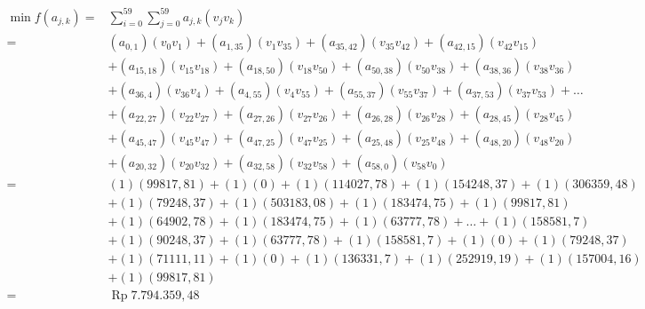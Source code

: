 {        {\footnotesize
            \begin{equation*}
                \begin{aligned}
                    \operatorname{min} f(a_{j,k}) = & \sum^{59}_{i=0} \sum^{59}_{j=0} a_{j,k}(v_{j}v_{k})                                                             \\
                    =                               & (a_{0,1})(v_{0}v_{1}) +(a_{1,35})(v_{1}v_{35}) +(a_{35,42})(v_{35}v_{42}) +(a_{42,15})(v_{42}v_{15})            \\
                                                    & +(a_{15,18})(v_{15}v_{18}) +(a_{18,50})(v_{18}v_{50}) +(a_{50,38})(v_{50}v_{38}) +(a_{38,36})(v_{38}v_{36})     \\
                                                    & +(a_{36,4})(v_{36}v_{4}) +(a_{4,55})(v_{4}v_{55}) +(a_{55,37})(v_{55}v_{37}) +(a_{37,53})(v_{37}v_{53}) + \dots \\
                                                    & +(a_{22,27})(v_{22}v_{27}) +(a_{27,26})(v_{27}v_{26}) +(a_{26,28})(v_{26}v_{28}) +(a_{28,45})(v_{28}v_{45})     \\
                                                    & +(a_{45,47})(v_{45}v_{47}) +(a_{47,25})(v_{47}v_{25}) +(a_{25,48})(v_{25}v_{48}) +(a_{48,20})(v_{48}v_{20})     \\
                                                    & +(a_{20,32})(v_{20}v_{32}) +(a_{32,58})(v_{32}v_{58}) +(a_{58,0})(v_{58}v_{0})                                  \\
                    =                               & (1)(99817,81) + (1)(0) + (1)(114027,78) + (1)(154248,37) + (1)(306359,48)                                       \\
                                                    & + (1)(79248,37) + (1)(503183,08) + (1)(183474,75) + (1)(99817,81)                                               \\
                                                    & + (1)(64902,78) + (1)(183474,75) + (1)(63777,78) + \dots + (1)(158581,7)                                        \\
                                                    & + (1)(90248,37) + (1)(63777,78) + (1)(158581,7) + (1)(0) + (1)(79248,37)                                        \\
                                                    & + (1)(71111,11) + (1)(0) + (1)(136331,7) + (1)(252919,19) + (1)(157004,16)                                      \\
                                                    & + (1)(99817,81)                                                                                                 \\
                    =                               & \operatorname{Rp}7.794.359,48
                \end{aligned}
            \end{equation*}
        }
}

\pagebreak
